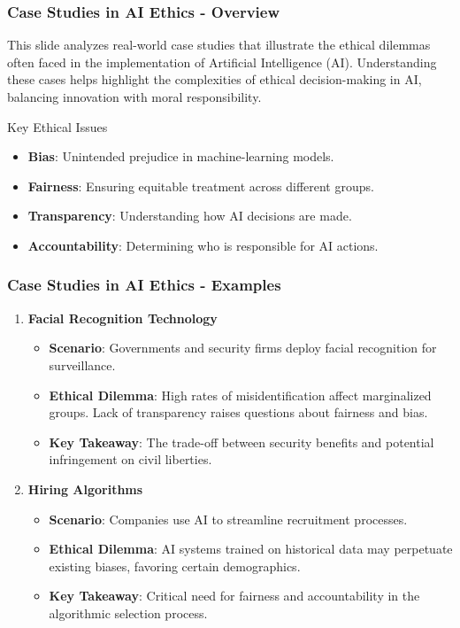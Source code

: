 \documentclass[aspectratio=169]{beamer}
\begin{document}
\begin{frame}[fragile]
    \frametitle{Case Studies in AI Ethics - Overview}
    This slide analyzes real-world case studies that illustrate the ethical dilemmas often faced in the implementation of Artificial Intelligence (AI). 
    Understanding these cases helps highlight the complexities of ethical decision-making in AI, balancing innovation with moral responsibility.
    
    \begin{block}{Key Ethical Issues}
        \begin{itemize}
            \item \textbf{Bias}: Unintended prejudice in machine-learning models.
            \item \textbf{Fairness}: Ensuring equitable treatment across different groups.
            \item \textbf{Transparency}: Understanding how AI decisions are made.
            \item \textbf{Accountability}: Determining who is responsible for AI actions.
        \end{itemize}
    \end{block}
\end{frame}

\begin{frame}[fragile]
    \frametitle{Case Studies in AI Ethics - Examples}
    \begin{enumerate}
        \item \textbf{Facial Recognition Technology}
        \begin{itemize}
            \item \textbf{Scenario}: Governments and security firms deploy facial recognition for surveillance.
            \item \textbf{Ethical Dilemma}: High rates of misidentification affect marginalized groups. Lack of transparency raises questions about fairness and bias.
            \item \textbf{Key Takeaway}: The trade-off between security benefits and potential infringement on civil liberties.
        \end{itemize}
        
        \item \textbf{Hiring Algorithms}
        \begin{itemize}
            \item \textbf{Scenario}: Companies use AI to streamline recruitment processes.
            \item \textbf{Ethical Dilemma}: AI systems trained on historical data may perpetuate existing biases, favoring certain demographics.
            \item \textbf{Key Takeaway}: Critical need for fairness and accountability in the algorithmic selection process.
        \end{itemize}
    \end{enumerate}
\end{frame}
\end{document}
